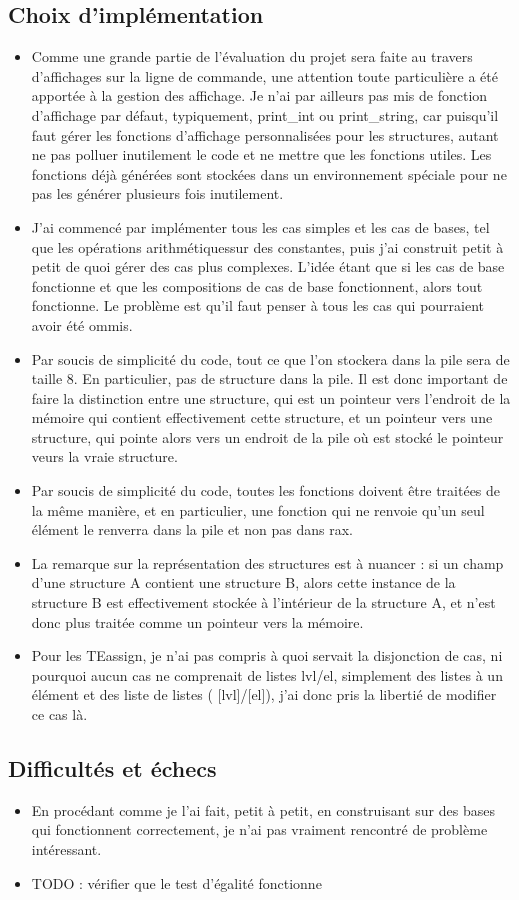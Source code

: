 \documentclass{article}
\begin{document}
\subsection{Choix d'implémentation}
\begin{itemize}
\item Comme une grande partie de l'évaluation du projet sera faite au travers d'affichages sur la ligne de commande, une attention toute particulière a été apportée à la gestion des affichage. Je n'ai par ailleurs pas mis de fonction d'affichage par défaut, typiquement, print\_int ou print\_string, car puisqu'il faut gérer les fonctions d'affichage personnalisées pour les structures, autant ne pas polluer inutilement le code et ne mettre que les fonctions utiles. Les fonctions déjà générées sont stockées dans un environnement spéciale pour ne pas les générer plusieurs fois inutilement.
\item J'ai commencé par implémenter tous les cas simples et les cas de bases, tel que les opérations arithmétiquessur des constantes, puis j'ai construit petit à petit de quoi gérer des cas plus complexes. L'idée étant que si les cas de base fonctionne et que les compositions de cas de base fonctionnent, alors tout fonctionne. Le problème est qu'il faut penser à tous les cas qui pourraient avoir été ommis.
\item Par soucis de simplicité du code, tout ce que l'on stockera dans la pile sera de taille 8. En particulier, pas de structure dans la pile. Il est donc important de faire la distinction entre une structure, qui est un pointeur vers l'endroit de la mémoire qui contient effectivement cette structure, et un pointeur vers une structure, qui pointe alors vers un endroit de la pile où est stocké le pointeur veurs la vraie structure.
\item Par soucis de simplicité du code, toutes les fonctions doivent être traitées de la même manière, et en particulier, une fonction qui ne renvoie qu'un seul élément le renverra dans la pile et non pas dans rax.
\item La remarque sur la représentation des structures est à nuancer : si un champ d'une structure A contient une structure B, alors cette instance de la structure B est effectivement stockée à l'intérieur de la structure A, et n'est donc plus traitée comme un pointeur vers la mémoire.
\item Pour les TEassign, je n'ai pas compris à quoi servait la disjonction de cas, ni pourquoi aucun cas ne comprenait de listes lvl/el, simplement des listes à un élément et des liste de listes ( [lvl]/[el]), j'ai donc pris la libertié de modifier ce cas là.
\end{itemize}

\subsection{Difficultés et échecs}
\begin{itemize}
\item En procédant comme je l'ai fait, petit à petit, en construisant sur des bases qui fonctionnent correctement, je n'ai pas vraiment rencontré de problème intéressant.
\item TODO : vérifier que le test d'égalité fonctionne 
\end{itemize}
\end{document}
